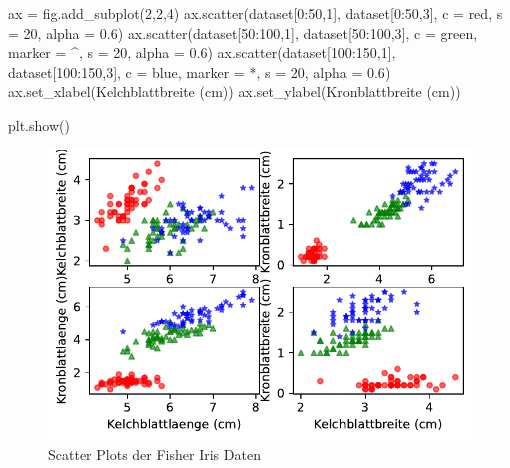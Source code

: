 \documentclass[
  a4paper,
  DIV=11]{scrreprt}
\newenvironment{Shaded}{\begin{snugshade}}{\end{snugshade}}
\newcommand{\DecValTok}[1]{\textcolor[rgb]{0.68,0.00,0.00}{#1}}
\newcommand{\FloatTok}[1]{\textcolor[rgb]{0.68,0.00,0.00}{#1}}
\newcommand{\NormalTok}[1]{\textcolor[rgb]{0.00,0.23,0.31}{#1}}
\newcommand{\OperatorTok}[1]{\textcolor[rgb]{0.37,0.37,0.37}{#1}}
\newcommand{\StringTok}[1]{\textcolor[rgb]{0.13,0.47,0.30}{#1}}
\theoremstyle{definition}
\theoremstyle{definition}
\theoremstyle{remark}
\begin{document}
\begin{Shaded}
\begin{Highlighting}[]
\NormalTok{ax }\OperatorTok{=}\NormalTok{ fig.add\_subplot(}\DecValTok{2}\NormalTok{,}\DecValTok{2}\NormalTok{,}\DecValTok{4}\NormalTok{)}
\NormalTok{ax.scatter(dataset[}\DecValTok{0}\NormalTok{:}\DecValTok{50}\NormalTok{,}\DecValTok{1}\NormalTok{], dataset[}\DecValTok{0}\NormalTok{:}\DecValTok{50}\NormalTok{,}\DecValTok{3}\NormalTok{], }
\NormalTok{            c }\OperatorTok{=} \StringTok{\textquotesingle{}red\textquotesingle{}}\NormalTok{, s }\OperatorTok{=} \DecValTok{20}\NormalTok{, alpha }\OperatorTok{=} \FloatTok{0.6}\NormalTok{)}
\NormalTok{ax.scatter(dataset[}\DecValTok{50}\NormalTok{:}\DecValTok{100}\NormalTok{,}\DecValTok{1}\NormalTok{], dataset[}\DecValTok{50}\NormalTok{:}\DecValTok{100}\NormalTok{,}\DecValTok{3}\NormalTok{], }
\NormalTok{            c }\OperatorTok{=} \StringTok{\textquotesingle{}green\textquotesingle{}}\NormalTok{, marker }\OperatorTok{=} \StringTok{\textquotesingle{}\^{}\textquotesingle{}}\NormalTok{, s }\OperatorTok{=} \DecValTok{20}\NormalTok{, alpha }\OperatorTok{=} \FloatTok{0.6}\NormalTok{)}
\NormalTok{ax.scatter(dataset[}\DecValTok{100}\NormalTok{:}\DecValTok{150}\NormalTok{,}\DecValTok{1}\NormalTok{], dataset[}\DecValTok{100}\NormalTok{:}\DecValTok{150}\NormalTok{,}\DecValTok{3}\NormalTok{], }
\NormalTok{            c }\OperatorTok{=} \StringTok{\textquotesingle{}blue\textquotesingle{}}\NormalTok{, marker }\OperatorTok{=} \StringTok{\textquotesingle{}*\textquotesingle{}}\NormalTok{, s }\OperatorTok{=} \DecValTok{20}\NormalTok{, alpha }\OperatorTok{=} \FloatTok{0.6}\NormalTok{)}
\NormalTok{ax.set\_xlabel(}\StringTok{\textquotesingle{}Kelchblattbreite (cm)\textquotesingle{}}\NormalTok{)}
\NormalTok{ax.set\_ylabel(}\StringTok{\textquotesingle{}Kronblattbreite (cm)\textquotesingle{}}\NormalTok{)}

\NormalTok{plt.show()}
\end{Highlighting}
\end{Shaded}

\begin{figure}[H]

{\centering \includegraphics{aad_files/figure-pdf/fig-imageirisscatterplot-output-1.pdf}

}

\caption{\label{fig-imageirisscatterplot}Scatter Plots der Fisher Iris
Daten}

\end{figure}
\end{document}

